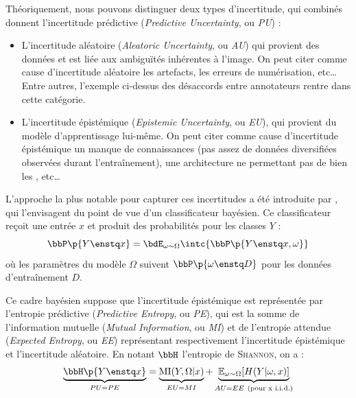 \documentclass[a4paper,french,bookmarks,12pt]{article}
\begin{document}
    \medskip
    Théoriquement, nous pouvons distinguer deux types d'incertitude, qui combinés donnent l'incertitude prédictive (\emph{Predictive Uncertainty}, ou \emph{PU}) :
    \begin{itemize}
        \item L'incertitude aléatoire (\emph{Aleatoric Uncertainty}, ou \emph{AU}) qui provient des données et est liée aux ambiguïtés inhérentes à l'image. On peut citer comme cause d'incertitude aléatoire les artefacts, les erreurs de numérisation, etc\dots{} Entre autres, l'exemple ci-dessus des désaccords entre annotateurs rentre dans cette catégorie.
        \item L'incertitude épistémique (\emph{Epistemic Uncertainty}, ou \emph{EU}), qui provient du modèle d’apprentissage lui-même. On peut citer comme cause d'incertitude épistémique un manque de connaissances (pas assez de données diversifiées observées durant l'entraînement), une architecture ne permettant pas de bien les , etc\dots
    \end{itemize}
    L'approche la plus notable pour capturer ces incertitudes a été introduite par \parencite{kendall2017}, qui l'envisagent du point de vue d'un classificateur bayésien. Ce classificateur reçoit une entrée \( x \) et produit des probabilités pour les classes $Y$ : 
    \[ \bbP\p{Y \enstq x} = \bdE_{\omega \sim \Omega}\intc{\bbP\p{Y \enstq x, \omega}} \]
    où les paramètres du modèle $\Omega$ suivent $\bbP\p{\omega \enstq D }$ pour les données d'entraînement $D$. 
    
    Ce cadre bayésien \parencite{smerkous2024} suppose que l'incertitude épistémique est représentée par l'entropie prédictive (\emph{Predictive Entropy}, ou \emph{PE}), qui est la somme de l'information mutuelle (\emph{Mutual Information}, ou \emph{MI}) et de l'entropie attendue (\emph{Expected Entropy}, ou \emph{EE}) représentant respectivement l'incertitude épistémique et l'incertitude aléatoire. En notant $\bbH$ l'entropie de \textsc{Shannon}, on a :
    \[
    \underbrace{\bbH\p{Y \enstq x}}_{PU = PE} = \underbrace{\text{MI}(Y, \Omega|x)}_{EU = MI} + \underbrace{\mathbb{E}_{\omega \sim \Omega}[H(Y|\omega, x)]}_{AU = EE \ \text{(pour x i.i.d.)}}
    \]
\end{document}

